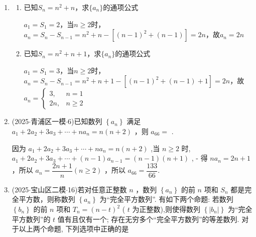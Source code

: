 \begin{enumerate}
    \item \begin{enumerate}
        \item 已知$S_n = n^2+n$，求$\{a_n\}$的通项公式
        \begin{jieda}
            $a_1 = S_1 = 2$，当$n \geq 2$时，$a_n = S_n - S_{n-1} = n^2+n-[(n-1)^2+(n-1)] = 2n$，故$a_n = 2n$
        \end{jieda}
        
        \item 已知$S_n = n^2+n+1$，求$\{a_n\}$的通项公式    \begin{jieda}
        $a_1 = S_1 = 3$，当$n \geq 2$时，$a_n = S_n - S_{n-1} = n^2+n+1-[(n-1)^2+(n-1)+1] = 2n$，故$a_n = \left\{\begin{array}{ll}
             3, & n = 1 \\
             2n, & n \geq 2
        \end{array}\right.$
    \end{jieda}
    \end{enumerate}
    \item (2025$\cdot$青浦区一模$\cdot$6)已知数列 $\left\{  {a}_{n}\right\}$ 满足 ${a}_{1} + 2{a}_{2} + 3{a}_{3} + \cdots  + n{a}_{n} = n\left( {n + 2}\right)$ ，则 ${a}_{66} =$ .
    \begin{jieda}
        因为 ${a}_{1} + 2{a}_{2} + 3{a}_{3} + \cdots  + n{a}_{n} = n\left( {n + 2}\right)$   ,当 $n \geq  2$ 时, ${a}_{1} + 2{a}_{2} + 3{a}_{3} + \cdots  + \left( {n - 1}\right) {a}_{n - 1} = \left( {n - 1}\right) \left( {n + 1}\right)$   ,   -  得 $n{a}_{n} = {2n} + 1$ ，所以 ${a}_{n} = \dfrac{{2n} + 1}{n}\left( {n \geq  2}\right)$ ，所以 ${a}_{66} =  \dfrac{133}{66}$.
    \end{jieda}
    \item (2025$\cdot$宝山区二模$\cdot$16)若对任意正整数 $n$ ，数列 $\left\{  {a}_{n}\right\}$ 的前 $n$ 项和 ${S}_{n}$ 都是完全平方数，则称数列 $\left\{  {a}_{n}\right\}$ 为“完全平方数列”. 有如下两个命题:    若数列 $\left\{  {b}_{n}\right\}$ 的前 $n$ 项和 ${T}_{n} = {\left( n - t\right) }^{2}$ ( $t$ 为正整数),则使得数列 $\left\{  \left| {b}_{n}\right| \right\}$ 为“完全平方数列”的 $t$ 值有且仅有一个;    存在无穷多个“完全平方数列”的等差数列. 对于以上两个命题, 下列选项中正确的是 


\end{enumerate}
